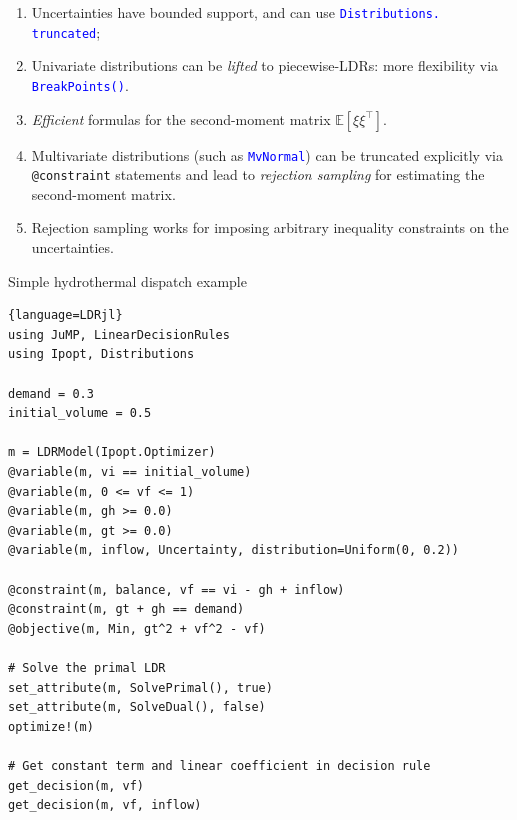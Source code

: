 \documentclass[a0paper,fontscale=0.285]{baposter} %
\newcommand{\alert}[1]{\textcolor{blue}{#1}}
\newcommand{\alertt}[1]{\alert{\texttt{#1}}}
\begin{document}
\begin{poster}
{\begin{multicols}{2}
\begin{enumerate}
    \item Uncertainties have bounded support, and can use \alertt{Distributions.} \alertt{truncated};
    \item Univariate distributions can be \emph{lifted} to piecewise-LDRs: more flexibility via \alertt{BreakPoints()}.
    \item \emph{Efficient} formulas for the second-moment matrix $\mathbb{E}\left[\xi \xi^\top \right]$.
      \medskip

    \item Multivariate distributions (such as \alertt{MvNormal}) can be truncated explicitly via \texttt{@constraint} statements and lead to \emph{rejection sampling} for estimating the second-moment matrix.
    \item Rejection sampling works for imposing arbitrary inequality constraints on the uncertainties.
  \end{enumerate}

\end{multicols}
}


\begin{posterbox}[name=example1,column=1,span=2,below=features]
{Simple hydrothermal dispatch example}

  \begin{multicols}{2}
  \small
  \begin{lstlisting}{language=LDRjl}
using JuMP, LinearDecisionRules
using Ipopt, Distributions

demand = 0.3
initial_volume = 0.5

m = LDRModel(Ipopt.Optimizer)
@variable(m, vi == initial_volume)
@variable(m, 0 <= vf <= 1)
@variable(m, gh >= 0.0)
@variable(m, gt >= 0.0)
@variable(m, inflow, Uncertainty, distribution=Uniform(0, 0.2))

@constraint(m, balance, vf == vi - gh + inflow)
@constraint(m, gt + gh == demand)
@objective(m, Min, gt^2 + vf^2 - vf)

# Solve the primal LDR
set_attribute(m, SolvePrimal(), true)
set_attribute(m, SolveDual(), false)
optimize!(m)

# Get constant term and linear coefficient in decision rule
get_decision(m, vf)
get_decision(m, vf, inflow)
  \end{lstlisting}
  \end{multicols}
\end{posterbox}


\end{poster}
\end{document}

